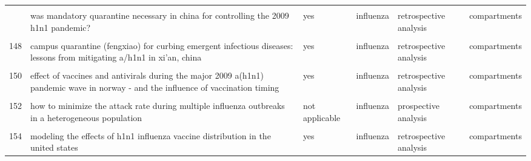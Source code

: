 \documentclass[
]{article}
\begin{document}
\begin{landscape}
\begin{longtable}{l>{\raggedright\arraybackslash}p{3.3cm}l>{\raggedright\arraybackslash}p{3.3cm}>{\raggedright\arraybackslash}p{2cm}l}
\cellcolor{gray!6}{145} & \cellcolor{gray!6}{vaccination against foot-and-mouth disease: do initial conditions affect its benefit?} & \cellcolor{gray!6}{yes} & \cellcolor{gray!6}{fmd} & \cellcolor{gray!6}{retrospective analysis} & \cellcolor{gray!6}{agents}\\
\addlinespace
146 & was mandatory quarantine necessary in china for controlling the 2009 h1n1 pandemic? & yes & influenza & retrospective analysis & compartments\\
\cellcolor{gray!6}{147} & \cellcolor{gray!6}{a contact-network-based simulation model for evaluating interventions under 'what-if' scenarios in epidemic} & \cellcolor{gray!6}{yes} & \cellcolor{gray!6}{influenza} & \cellcolor{gray!6}{prospective analysis} & \cellcolor{gray!6}{agents}\\
148 & campus quarantine (fengxiao) for curbing emergent infectious diseases: lessons from mitigating a/h1n1 in xi'an, china & yes & influenza & retrospective analysis & compartments\\
\cellcolor{gray!6}{149} & \cellcolor{gray!6}{dynamic modelling of costs and health consequences of school closure during an influenza pandemic} & \cellcolor{gray!6}{yes} & \cellcolor{gray!6}{influenza} & \cellcolor{gray!6}{prospective analysis} & \cellcolor{gray!6}{compartments}\\
150 & effect of vaccines and antivirals during the major 2009 a(h1n1) pandemic wave in norway - and the influence of vaccination timing & yes & influenza & retrospective analysis & compartments\\
\addlinespace
\cellcolor{gray!6}{151} & \cellcolor{gray!6}{estimating the value of containment strategies in delaying the arrival time of an influenza pandemic: a case study of travel restriction and patient isolation} & \cellcolor{gray!6}{not applicable} & \cellcolor{gray!6}{influenza} & \cellcolor{gray!6}{prospective analysis} & \cellcolor{gray!6}{compartments}\\
152 & how to minimize the attack rate during multiple influenza outbreaks in a heterogeneous population & not applicable & influenza & prospective analysis & compartments\\
\cellcolor{gray!6}{153} & \cellcolor{gray!6}{modeling strategies for controlling h1n1 outbreaks in china} & \cellcolor{gray!6}{yes} & \cellcolor{gray!6}{influenza} & \cellcolor{gray!6}{retrospective analysis} & \cellcolor{gray!6}{compartments}\\
154 & modeling the effects of h1n1 influenza vaccine distribution in the united states & yes & influenza & retrospective analysis & compartments\\

\end{longtable}
\end{landscape}
\end{document}
